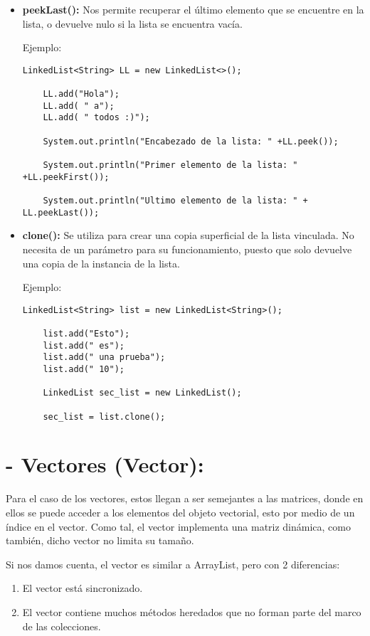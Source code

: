 \documentclass[12pt, letterpaper]{article} %
\begin{document}
\begin{itemize}
    \item \textbf{peekLast():} Nos permite recuperar el último elemento que se encuentre en la lista, o devuelve nulo si la lista se encuentra vacía.

    Ejemplo:
    \lstset{language = Java, breaklines=true, basicstyle=\footnotesize}
    \begin{lstlisting}[frame=single]
    LinkedList<String> LL = new LinkedList<>();

    LL.add("Hola");  
    LL.add( " a");
    LL.add( " todos :)");

    System.out.println("Encabezado de la lista: " +LL.peek());

    System.out.println("Primer elemento de la lista: " +LL.peekFirst());

    System.out.println("Ultimo elemento de la lista: " + LL.peekLast());
    \end{lstlisting}

    \item \textbf{clone():} Se utiliza para crear una copia superficial de la lista vinculada. No necesita de un parámetro para su funcionamiento, puesto que solo devuelve una copia de la instancia de la lista.

    Ejemplo:
    \lstset{language = Java, breaklines=true, basicstyle=\footnotesize}
    \begin{lstlisting}[frame=single]
    LinkedList<String> list = new LinkedList<String>();

    list.add("Esto");
    list.add(" es");
    list.add(" una prueba");
    list.add(" 10");

    LinkedList sec_list = new LinkedList();

    sec_list = list.clone();
    \end{lstlisting}
    
\end{itemize}

\section*{- Vectores (Vector):}
Para el caso de los vectores, estos llegan a ser semejantes a las matrices, donde en ellos se puede acceder a los elementos del objeto vectorial, esto por medio de un índice en el vector. Como tal, el vector implementa una matriz dinámica, como también, dicho vector no limita su tamaño.

Si nos damos cuenta, el vector es similar a ArrayList, pero con 2 diferencias:
\begin{enumerate}
    \item El vector está sincronizado.
    \item El vector contiene muchos métodos heredados que no forman parte del marco de las colecciones.
\end{enumerate}
\end{document}
